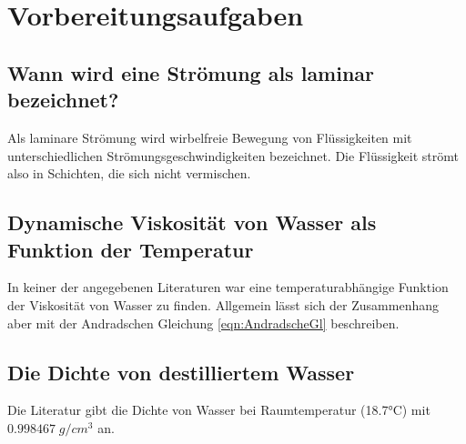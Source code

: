 \section{Vorbereitungsaufgaben}
\label{sec:Vorbereitungsaufgaben}

\subsection{Wann wird eine Strömung als laminar bezeichnet?}
    Als laminare Strömung  wird wirbelfreie Bewegung von Flüssigkeiten mit unterschiedlichen Strömungsgeschwindigkeiten bezeichnet. Die Flüssigkeit strömt also in Schichten, die sich nicht vermischen.
    
\subsection{Dynamische Viskosität von Wasser als Funktion der Temperatur}
    In keiner der angegebenen Literaturen war eine temperaturabhängige Funktion der Viskosität von Wasser zu finden. Allgemein lässt sich der Zusammenhang aber mit der Andradschen 
    Gleichung \eqref{eqn:AndradscheGl} beschreiben.

\subsection{Die Dichte von destilliertem Wasser} \label{wasserdichte}
    Die Literatur \cite{dichte_wasser} gibt die Dichte von Wasser bei Raumtemperatur (18.7°C) mit $0.998467 \;\unit{g/cm^3}$ an.
\newpage